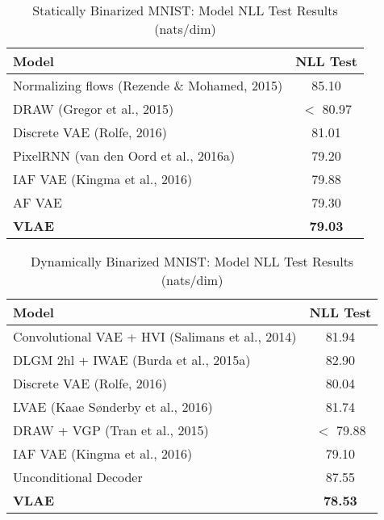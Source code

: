 \documentclass[12pt]{article}
\begin{document}
\begin{table}[H]
\centering
\caption{Statically Binarized MNIST: Model NLL Test Results (nats/dim)}
\label{tab:mnist_static}
\begin{tabular}{lc}
\toprule
\textbf{Model} & \textbf{NLL Test} \\
\midrule
Normalizing flows (Rezende \& Mohamed, 2015) & 85.10 \\
DRAW (Gregor et al., 2015) & $<$ 80.97 \\
Discrete VAE (Rolfe, 2016) & 81.01 \\
PixelRNN (van den Oord et al., 2016a) & 79.20 \\
IAF VAE (Kingma et al., 2016) & 79.88 \\
AF VAE & 79.30 \\
\textbf{VLAE} & \textbf{79.03} \\
\bottomrule
\end{tabular}
\end{table}

\begin{table}[H]
    \centering
    \caption{Dynamically Binarized MNIST: Model NLL Test Results (nats/dim)}
    \label{tab:mnist_dynamic}
    \begin{tabular}{lc}
    \toprule
    \textbf{Model} & \textbf{NLL Test} \\
    \midrule
    Convolutional VAE + HVI (Salimans et al., 2014) & 81.94 \\
    DLGM 2hl + IWAE (Burda et al., 2015a) & 82.90 \\
    Discrete VAE (Rolfe, 2016) & 80.04 \\
    LVAE (Kaae Sønderby et al., 2016) & 81.74 \\
    DRAW + VGP (Tran et al., 2015) & $<$ 79.88 \\
    IAF VAE (Kingma et al., 2016) & 79.10 \\
    Unconditional Decoder & 87.55 \\
    \textbf{VLAE} & \textbf{78.53} \\
    \bottomrule
    \end{tabular}
\end{table}
\end{document}
